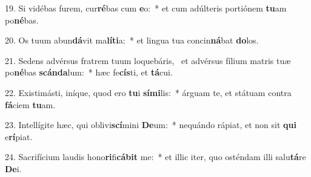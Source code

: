 19. Si vidébas furem, cur\textbf{ré}bas cum \textbf{e}o:~*  et cum adúlteris portiónem \textbf{tu}am po\textbf{né}bas.\

20. Os tuum abun\textbf{dá}vit ma\textbf{lí}\textbf{ti}a:~*  et lingua tua concin\textbf{ná}bat \textbf{do}los.\

21. Sedens advérsus fratrem tuum loquebáris, \dag\  et advérsus fílium matris tuæ po\textbf{né}bas \textbf{scán}\textbf{da}lum:~*  hæc fe\textbf{cís}ti, et \textbf{tá}cui.\

22. Existimásti, iníque, quod ero \textbf{tu}i \textbf{sí}\textbf{mi}lis:~*  árguam te, et státuam contra \textbf{fá}ciem \textbf{tu}am.\

23. Intellígite hæc, qui oblivi\textbf{scí}mini \textbf{De}um:~*  nequándo rápiat, et non sit \textbf{qui} e\textbf{rí}piat.\

24. Sacrifícium laudis hono\textbf{ri}fi\textbf{cá}\textbf{bit} me:~*  et illic iter, quo osténdam illi salu\textbf{tá}re \textbf{De}i.\

